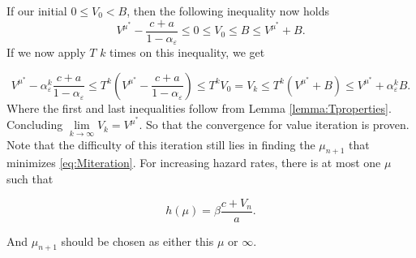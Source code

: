 If our initial $0\leq V_0<B$, then the following inequality now holds
$$
V^{\mu^*}-\frac{c+a}{1-\alpha_\varepsilon}\leq 0\leq V_{0}\leq B\leq V^{\mu^*}+B.
$$
If we now apply $T$ $k$ times on this inequality, we get

\begin{equation}
V^{\mu^*}-\alpha_\varepsilon^k\frac{c+a}{1-\alpha_\varepsilon} \leq T^k(V^{\mu^*}-\frac{c+a}{1-\alpha_\varepsilon})\leq  T^kV_{0}=V_k\leq T^k(V^{\mu^*}+B) \leq V^{\mu^*}+\alpha_\varepsilon^kB.
\end{equation}
Where the first and last inequalities follow from Lemma \ref{lemma:Tproperties}.
Concluding $\lim\limits_{k\rightarrow\infty}V_k=V^{\mu^*}$.
So that the convergence for value iteration is proven.
Note that the difficulty of this iteration still lies in finding the $\mu_{n+1}$ that minimizes \eqref{eq:Miteration}.
For increasing hazard rates, there is at most one $\mu$ such that

$$
h(\mu)= \beta\frac{c+V_n}{a}.
$$

And $\mu_{n+1}$ should be chosen as either this $\mu$ or $\infty$.

